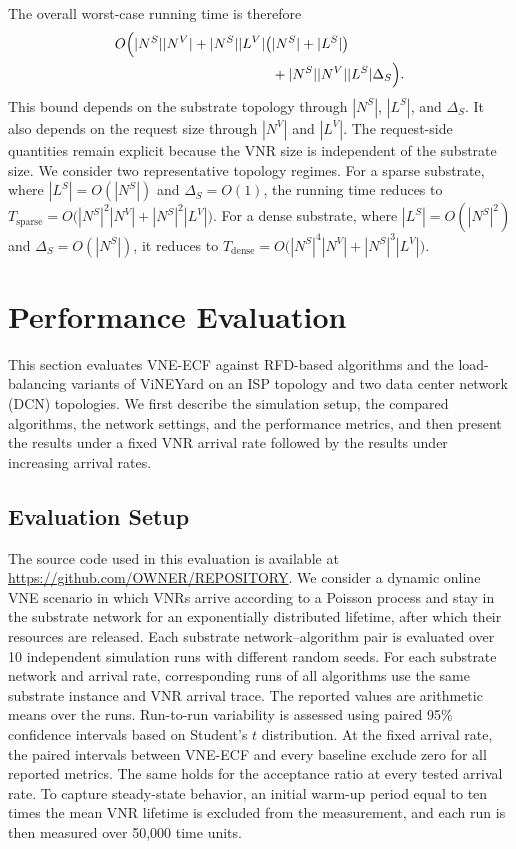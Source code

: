 \documentclass{ieeeaccess}
\newcommand{\ecfvne}{VNE-ECF}
\begin{document}
The overall worst-case running time is therefore
\begin{equation}
	\begin{aligned}
		O\Bigl(
		|N^S||N^V|+|N^S||L^V|\bigl( & |N^S|+|L^S|\bigr)        \\
		                            & +|N^S||N^V||L^S|\Delta_S 
		\Bigr).
	\end{aligned}
	\label{eq:complexity}
\end{equation}
This bound depends on the substrate topology through $|N^S|$, $|L^S|$, and $\Delta_S$. It also
depends on the request size through $|N^V|$ and $|L^V|$. The request-side quantities remain
explicit because the VNR size is independent of the substrate size. We consider two representative
topology regimes. For a sparse substrate, where $|L^S|=O(|N^S|)$ and $\Delta_S=O(1)$, the
running time reduces to $T_{\mathrm{sparse}}=O\bigl(|N^S|^2|N^V|+|N^S|^2|L^V|\bigr)$. For a dense
substrate, where $|L^S|=O(|N^S|^2)$ and $\Delta_S=O(|N^S|)$, it reduces to
$T_{\mathrm{dense}}=O\bigl(|N^S|^4|N^V|+|N^S|^3|L^V|\bigr)$.

\section{Performance Evaluation}
\label{sec:performance_evaluation}

This section evaluates \ecfvne{} against RFD-based algorithms and the load-balancing variants of
ViNEYard on an ISP topology and two data center network (DCN) topologies. We first describe
the simulation setup, the compared algorithms, the network settings, and the performance metrics,
and then present the results under a fixed VNR arrival rate followed by the results under
increasing arrival rates.


\subsection{Evaluation Setup}

The source code used in this evaluation is available at
\url{https://github.com/OWNER/REPOSITORY}.
We consider a dynamic online VNE scenario in which VNRs arrive according to a Poisson process and
stay in the substrate network for an exponentially distributed lifetime, after which their
resources are released. Each substrate network--algorithm pair is
evaluated over 10 independent simulation runs with different random seeds. For each substrate
network and arrival rate, corresponding runs of all algorithms use the same substrate instance and
VNR arrival trace. The reported values are arithmetic means over the runs. Run-to-run variability
is assessed using paired 95\% confidence intervals based on Student's $t$ distribution. At the fixed
arrival rate, the paired intervals between \ecfvne{} and every baseline exclude zero for all reported
metrics. The same holds for the acceptance ratio at every tested arrival rate. To capture
steady-state behavior, an initial warm-up
period equal to ten times the mean VNR lifetime is excluded from the measurement, and each run is
then measured over 50{,}000 time units.
\end{document}
